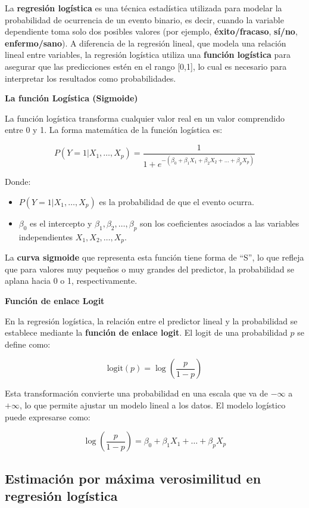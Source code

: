 \documentclass[
  letterpaper,
  DIV=11,
  numbers=noendperiod]{scrreprt}
\providecommand{\tightlist}{%
  \setlength{\itemsep}{0pt}\setlength{\parskip}{0pt}}
\begin{document}
La \textbf{regresión logística} es una técnica estadística utilizada
para modelar la probabilidad de ocurrencia de un evento binario, es
decir, cuando la variable dependiente toma solo dos posibles valores
(por ejemplo, \textbf{éxito/fracaso}, \textbf{sí/no},
\textbf{enfermo/sano}). A diferencia de la regresión lineal, que modela
una relación lineal entre variables, la regresión logística utiliza una
\textbf{función logística} para asegurar que las predicciones estén en
el rango {[}0,1{]}, lo cual es necesario para interpretar los resultados
como probabilidades.

\textbf{La función Logística (Sigmoide)}

La función logística transforma cualquier valor real en un valor
comprendido entre 0 y 1. La forma matemática de la función logística es:

\[
P(Y = 1 | X_1, \dots, X_p) = \frac{1}{1 + e^{-(\beta_0 + \beta_1 X_1 + \beta_2 X_2 + \dots + \beta_p X_p)}}
\]

Donde:

\begin{itemize}
\tightlist
\item
  \(P(Y = 1 | X_1, \dots, X_p)\) es la probabilidad de que el evento
  ocurra.
\item
  \(\beta_0\) es el intercepto y \(\beta_1, \beta_2, \dots, \beta_p\)
  son los coeficientes asociados a las variables independientes
  \(X_1, X_2, \dots, X_p\).
\end{itemize}

La \textbf{curva sigmoide} que representa esta función tiene forma de
``S'', lo que refleja que para valores muy pequeños o muy grandes del
predictor, la probabilidad se aplana hacia 0 o 1, respectivamente.

\textbf{Función de enlace Logit}

En la regresión logística, la relación entre el predictor lineal y la
probabilidad se establece mediante la \textbf{función de enlace logit}.
El logit de una probabilidad \(p\) se define como:

\[
\text{logit}(p) = \log\left(\frac{p}{1 - p}\right)
\]

Esta transformación convierte una probabilidad en una escala que va de
\(-\infty\) a \(+\infty\), lo que permite ajustar un modelo lineal a los
datos. El modelo logístico puede expresarse como:

\[
\log\left(\frac{p}{1 - p}\right) = \beta_0 + \beta_1 X_1 + \dots + \beta_p X_p
\]

\subsection{Estimación por máxima verosimilitud en regresión
logística}\label{estimaciuxf3n-por-muxe1xima-verosimilitud-en-regresiuxf3n-loguxedstica}
\end{document}
